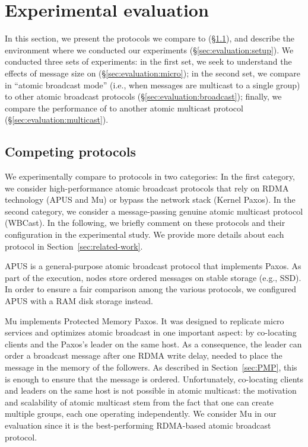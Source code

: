 \section{Experimental evaluation}
\label{sec:experimental-evaluation}

In this section, we present the protocols we compare \libname to (\S\ref{sec:comp}), and
describe the environment where we conducted our experiments (\S\ref{sec:evaluation:setup}).
We conducted three sets of experiments:
in the first set, we seek to understand the effects of message size on \libname (\S\ref{sec:evaluation:micro});
in the second set, we compare \libname in ``atomic broadcast mode'' (i.e., when messages are multicast to a single group) to other atomic broadcast protocols (\S\ref{sec:evaluation:broadcast});
finally, we compare the performance of \libname to another atomic multicast protocol (\S\ref{sec:evaluation:multicast}).

\subsection{Competing protocols}
\label{sec:comp}

We experimentally compare \libname to protocols in two categories:
In the first category, we consider high-performance atomic broadcast protocols that rely on RDMA technology (APUS and Mu) or bypass the network stack (Kernel Paxos).
In the second category, we consider a message-passing genuine atomic multicast protocol (WBCast).
In the following, we briefly comment on these protocols and their configuration in the experimental study.
We provide more details about each protocol in Section~\ref{sec:related-work}.

APUS is a general-purpose atomic broadcast protocol that implements Paxos.
As part of the execution, nodes store ordered messages on stable storage (e.g., SSD).
In order to ensure a fair comparison among the various protocols, we configured APUS with a RAM disk storage instead.

Mu \cite{Aguilera2019} implements Protected Memory Paxos.
It was designed to replicate micro services and optimizes atomic broadcast in one important aspect: by co-locating clients and the Paxos's leader on the same host.
As a consequence, the leader can order a broadcast message after one RDMA write delay, needed to place the message in the memory of the followers.
As described in Section~\ref{sec:PMP}, this is enough to ensure that the message is ordered.
Unfortunately, co-locating clients and leaders on the same host is not possible in atomic multicast: the motivation and scalability of atomic multicast stem from the fact that one can create multiple groups, each one operating independently.
We consider Mu in our evaluation since it is the best-performing RDMA-based atomic broadcast protocol.

